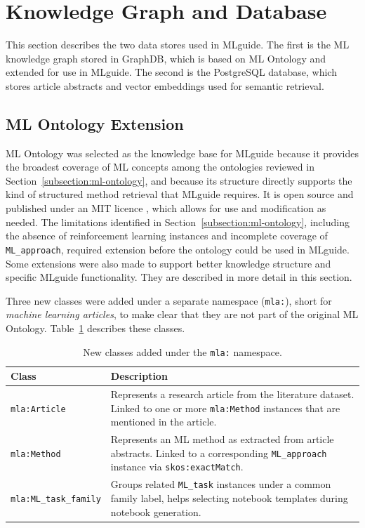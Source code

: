 
\section{Knowledge Graph and Database}
\label{sec:knowledge-graph-and-database}

This section describes the two data stores used in MLguide. The first 
is the ML knowledge graph stored in GraphDB, which is based on ML 
Ontology and extended for use in MLguide. The second is the PostgreSQL 
database, which stores article abstracts and vector embeddings used 
for semantic retrieval.

\subsection{ML Ontology Extension}

ML Ontology was selected as the knowledge base for MLguide because it 
provides the broadest coverage of ML concepts among the ontologies 
reviewed in Section~\ref{subsection:ml-ontology}, and because its 
structure directly supports the kind of structured method retrieval 
that MLguide requires. It is open source and published under an MIT 
licence \parencite{humm2026industry_ready_machine_learning_ontology}, 
which allows for use and modification as needed.
The limitations identified in 
Section~\ref{subsection:ml-ontology}, including the absence of 
reinforcement learning instances and incomplete coverage of 
\texttt{ML\_approach}, required extension before the ontology could 
be used in MLguide. Some extensions were also made to support better
knowledge structure and specific MLguide functionality. 
They are described in more detail in this section.

Three new classes were added under a separate namespace 
(\texttt{mla:}), short for \textit{machine learning articles}, 
to make clear that they are not part of the original ML Ontology. 
Table~\ref{tab:mla-classes} describes these classes.

\begin{table}[H]
\centering
\caption[New ontology classes]{New classes added under the \texttt{mla:} 
namespace.}
\label{tab:mla-classes}
\begin{tabularx}{\textwidth}{lX}
\toprule
\textbf{Class} & \textbf{Description} \\
\midrule
\texttt{mla:Article} & Represents a research article from the 
literature dataset. Linked to one or more \texttt{mla:Method} 
instances that are mentioned in the article. \\
\midrule
\texttt{mla:Method} & Represents an ML method as extracted from 
article abstracts. Linked to a corresponding 
\texttt{ML\_approach} instance via \texttt{skos:exactMatch}. \\
\midrule
\texttt{mla:ML\_task\_family} & Groups related \texttt{ML\_task} 
instances under a common family label, helps selecting notebook 
templates during notebook generation. \\
\bottomrule
\end{tabularx}
\end{table}

